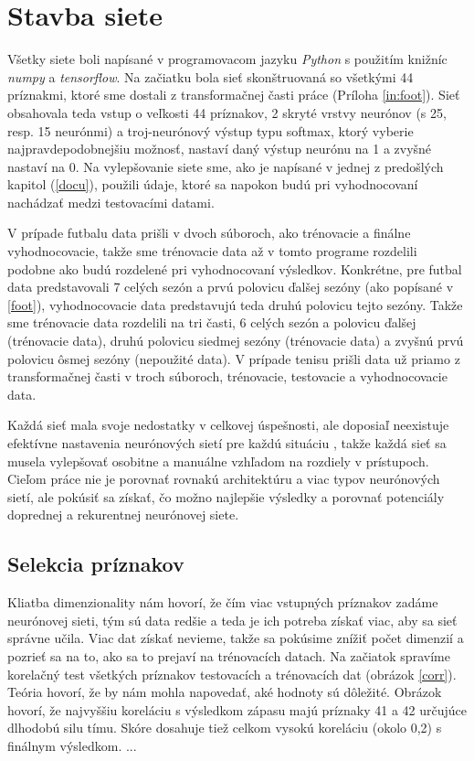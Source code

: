 \chapter{Stavba siete} \label{stavba}

Všetky siete boli napísané v programovacom jazyku \textit{Python} s použitím knižníc \textit{numpy} a \textit{tensorflow}.
Na začiatku bola sieť skonštruovaná so všetkými 44 príznakmi, ktoré sme dostali z transformačnej časti práce (Príloha \ref{in:foot}).
Sieť obsahovala teda vstup o veľkosti 44 príznakov, 2 skryté vrstvy neurónov (s 25, resp. 15 neurónmi) a troj-neurónový výstup typu softmax, ktorý vyberie najpravdepodobnejšiu možnosť, nastaví daný výstup neurónu na 1 a zvyšné nastaví na 0.
Na vylepšovanie siete sme, ako je napísané v jednej z predošlých kapitol (\ref{docu}), použili údaje, ktoré sa napokon budú pri vyhodnocovaní nachádzať medzi testovacími datami. 

V prípade futbalu data prišli v dvoch súboroch, ako trénovacie a finálne vyhodnocovacie, takže sme trénovacie data až v tomto programe rozdelili podobne ako budú rozdelené pri vyhodnocovaní výsledkov. 
Konkrétne, pre futbal data predstavovali 7 celých sezón a prvú polovicu ďalšej sezóny (ako popísané v \ref{foot}), vyhodnocovacie data predstavujú teda druhú polovicu tejto sezóny. 
Takže sme trénovacie data rozdelili na tri časti, 6 celých sezón a polovicu ďalšej (trénovacie data), druhú polovicu siedmej sezóny (trénovacie data) a zvyšnú prvú polovicu ôsmej sezóny (nepoužité data).
V prípade tenisu prišli data už priamo z transformačnej časti v troch súboroch, trénovacie, testovacie a vyhodnocovacie data.

Každá sieť mala svoje nedostatky v celkovej úspešnosti, ale doposiaľ neexistuje efektívne nastavenia neurónových sietí pre každú situáciu \citep{gitgud}, takže každá sieť sa musela vylepšovať osobitne a manuálne vzhľadom na rozdiely v prístupoch.
Cieľom práce nie je porovnať rovnakú architektúru a viac typov neurónových sietí, ale pokúsiť sa získať, čo možno najlepšie výsledky a porovnať potenciály doprednej a rekurentnej neurónovej siete.

\section{Selekcia príznakov}
Kliatba dimenzionality nám hovorí, že čím viac vstupných príznakov zadáme neurónovej sieti, tým sú data redšie a teda je ich potreba získať viac, aby sa sieť správne učila. Viac dat získať nevieme, takže sa pokúsime znížiť počet dimenzií a pozrieť sa na to, ako sa to prejaví na trénovacích datach.
Na začiatok spravíme korelačný test všetkých príznakov testovacích a trénovacích dat (obrázok \ref{corr}).
Teória hovorí, že by nám mohla napovedať, aké hodnoty sú dôležité.
Obrázok hovorí, že najvyššiu koreláciu s výsledkom zápasu majú príznaky 41 a 42 určujúce dlhodobú silu tímu. Skóre dosahuje tiež celkom vysokú koreláciu (okolo 0,2) s finálnym výsledkom.
...

